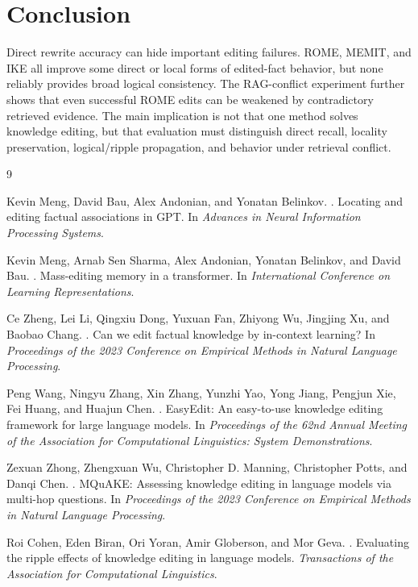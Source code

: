 \documentclass[11pt]{article}
\begin{document}
\section{Conclusion}

Direct rewrite accuracy can hide important editing failures. ROME, MEMIT, and IKE all improve some direct or local forms of edited-fact behavior, but none reliably provides broad logical consistency. The RAG-conflict experiment further shows that even successful ROME edits can be weakened by contradictory retrieved evidence. The main implication is not that one method solves knowledge editing, but that evaluation must distinguish direct recall, locality preservation, logical/ripple propagation, and behavior under retrieval conflict.

\begin{thebibliography}{9}

Kevin Meng, David Bau, Alex Andonian, and Yonatan Belinkov.
.
\newblock Locating and editing factual associations in GPT.
\newblock In \emph{Advances in Neural Information Processing Systems}.

Kevin Meng, Arnab Sen Sharma, Alex Andonian, Yonatan Belinkov, and David Bau.
.
\newblock Mass-editing memory in a transformer.
\newblock In \emph{International Conference on Learning Representations}.

Ce Zheng, Lei Li, Qingxiu Dong, Yuxuan Fan, Zhiyong Wu, Jingjing Xu, and Baobao Chang.
.
\newblock Can we edit factual knowledge by in-context learning?
\newblock In \emph{Proceedings of the 2023 Conference on Empirical Methods in Natural Language Processing}.

Peng Wang, Ningyu Zhang, Xin Zhang, Yunzhi Yao, Yong Jiang, Pengjun Xie, Fei Huang, and Huajun Chen.
.
\newblock EasyEdit: An easy-to-use knowledge editing framework for large language models.
\newblock In \emph{Proceedings of the 62nd Annual Meeting of the Association for Computational Linguistics: System Demonstrations}.

Zexuan Zhong, Zhengxuan Wu, Christopher D. Manning, Christopher Potts, and Danqi Chen.
.
\newblock MQuAKE: Assessing knowledge editing in language models via multi-hop questions.
\newblock In \emph{Proceedings of the 2023 Conference on Empirical Methods in Natural Language Processing}.

Roi Cohen, Eden Biran, Ori Yoran, Amir Globerson, and Mor Geva.
.
\newblock Evaluating the ripple effects of knowledge editing in language models.
\newblock \emph{Transactions of the Association for Computational Linguistics}.

\end{thebibliography}
\end{document}
